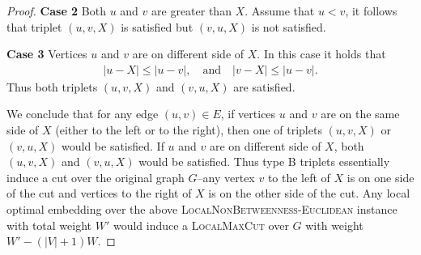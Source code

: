 \documentclass{article}
\theoremstyle{definition}  %
\theoremstyle{plain}
\numberwithin{observation}{section}
\numberwithin{claim}{section}
\numberwithin{fact}{section}
\numberwithin{lemma}{section}
\numberwithin{proposition}{section}
\numberwithin{theorem}{section}
\numberwithin{corollary}{section}
\numberwithin{definition}{section}
\theoremstyle{plain}
\begin{document}
\begin{proof}
\textbf{Case 2} Both $u$ and $v$ are greater than $X$. Assume that $u < v$, it follows that triplet $(u, v, X)$ is satisfied but $(v, u, X)$ is not satisfied.

\textbf{Case 3} Vertices $u$ and $v$ are on different side of $X$. In this case it holds that
\begin{align*}
    |u - X| \leq |u - v|, \quad \text{and} \quad |v - X| \leq |u - v|. 
\end{align*}
Thus both triplets $(u, v, X)$ and $(v, u ,X)$ are satisfied.

We conclude that for any edge $(u, v) \in E$, if vertices $u$ and $v$ are on the same side of $X$ (either to the left or to the right), then one of triplets $(u, v, X)$ or $(v, u ,X)$ would be satisfied. If $u$ and $v$ are on different side of $X$, both $(u, v, X)$ and $(v, u ,X)$ would be satisfied. Thus type B triplets essentially induce a cut over the original graph $G$--any vertex $v$ to the left of $X$ is on one side of the cut and vertices to the right of $X$ is on the other side of the cut. Any local optimal embedding over the above \textsc{LocalNonBetweenness-Euclidean} instance with total weight $W'$ would induce a \textsc{LocalMaxCut} over $G$ with weight $W' - (|V| + 1)W.$
\end{proof}







\end{document}
